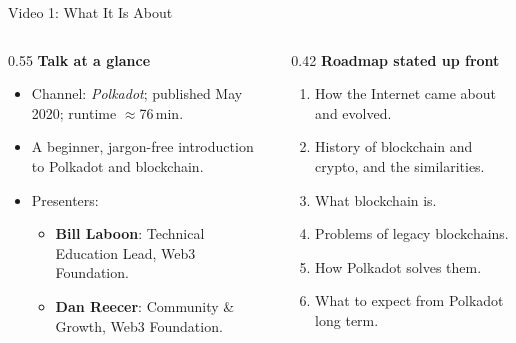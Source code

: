 \documentclass[aspectratio=169,11pt]{beamer}
\begin{document}
\begin{frame}{Video 1: What It Is About}
  \small
  \begin{columns}[T,onlytextwidth]
    \begin{column}{0.55\textwidth}
      \textbf{Talk at a glance}
      \begin{itemize}
        \item Channel: \emph{Polkadot}; published May 2020; runtime $\approx$76\,min.
        \item A beginner, jargon-free introduction to Polkadot and blockchain.
        \item Presenters:
          \begin{itemize}
            \item \textbf{Bill Laboon}: Technical Education Lead, Web3 Foundation.
            \item \textbf{Dan Reecer}: Community \& Growth, Web3 Foundation.
          \end{itemize}
      \end{itemize}
    \end{column}
    \begin{column}{0.42\textwidth}
      \textbf{Roadmap stated up front}
      \begin{enumerate}
        \item How the Internet came about and evolved.
        \item History of blockchain and crypto, and the similarities.
        \item What blockchain is.
        \item Problems of legacy blockchains.
        \item How Polkadot solves them.
        \item What to expect from Polkadot long term.
      \end{enumerate}
    \end{column}
  \end{columns}
\end{frame}
\end{document}

